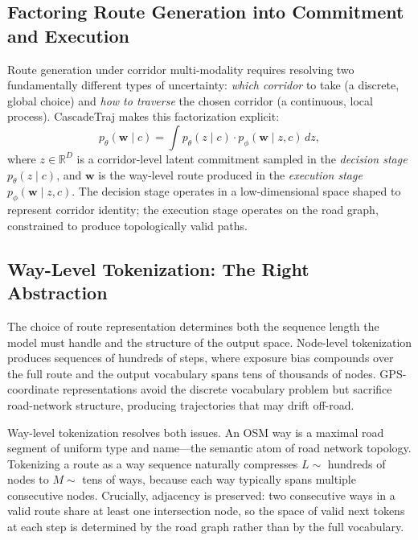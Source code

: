 
\subsection{Factoring Route Generation into Commitment and Execution}

Route generation under corridor multi-modality requires resolving two fundamentally different types of uncertainty: \emph{which corridor} to take (a discrete, global choice) and \emph{how to traverse} the chosen corridor (a continuous, local process).
CascadeTraj makes this factorization explicit:
\begin{equation}
  p_\theta(\mathbf{w} \mid c) = \int p_\theta(z \mid c) \cdot p_\phi(\mathbf{w} \mid z, c) \, dz,
  \label{eq:factorization}
\end{equation}
where $z \in \mathbb{R}^D$ is a corridor-level latent commitment sampled in the \emph{decision stage} $p_\theta(z \mid c)$, and $\mathbf{w}$ is the way-level route produced in the \emph{execution stage} $p_\phi(\mathbf{w} \mid z, c)$.
The decision stage operates in a low-dimensional space shaped to represent corridor identity; the execution stage operates on the road graph, constrained to produce topologically valid paths.

\subsection{Way-Level Tokenization: The Right Abstraction}
\label{sec:way-tokenization}

The choice of route representation determines both the sequence length the model must handle and the structure of the output space.
Node-level tokenization produces sequences of hundreds of steps, where exposure bias compounds over the full route and the output vocabulary spans tens of thousands of nodes.
GPS-coordinate representations avoid the discrete vocabulary problem but sacrifice road-network structure, producing trajectories that may drift off-road.

Way-level tokenization resolves both issues.
An OSM way is a maximal road segment of uniform type and name---the semantic atom of road network topology.
Tokenizing a route as a way sequence naturally compresses $L \sim$ hundreds of nodes to $M \sim$ tens of ways, because each way typically spans multiple consecutive nodes.
Crucially, adjacency is preserved: two consecutive ways in a valid route share at least one intersection node, so the space of valid next tokens at each step is determined by the road graph rather than by the full vocabulary.

